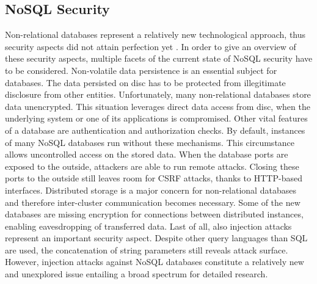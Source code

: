 \subsection{NoSQL Security}
Non-relational databases represent a relatively new technological approach, thus security aspects did not attain perfection yet \cite{Okman:2011, Noiumkar:2014}. In order to give an overview of these security aspects, multiple facets of the current state of NoSQL security have to be considered. Non-volatile data persistence is an essential subject for databases. The data persisted on disc has to be protected from illegitimate disclosure from other entities. Unfortunately, many non-relational databases store data unencrypted. This situation leverages direct data access from disc, when the underlying system or one of its applications is compromised. Other vital features of a database are authentication and authorization checks. By default, instances of many NoSQL databases run without these mechanisms. This circumstance allows uncontrolled access on the stored data. When the database ports are exposed to the outside, attackers are able to run remote attacks. Closing these ports to the outside still leaves room for CSRF attacks, thanks to HTTP-based interfaces. Distributed storage is a major concern for non-relational databases and therefore inter-cluster communication becomes necessary. Some of the new databases are missing encryption for connections between distributed instances, enabling eavesdropping of transferred data. Last of all, also injection attacks represent an important security aspect. Despite other query languages than SQL are used, the concatenation of string parameters still reveals attack surface. However, injection attacks against NoSQL databases constitute a relatively new and unexplored issue entailing a broad spectrum for detailed research.

